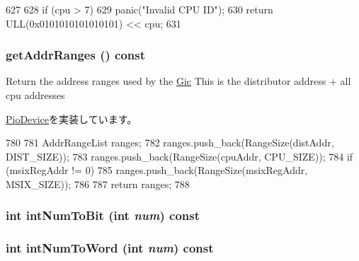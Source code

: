 \begin{DoxyCode}
627 {
628     if (cpu > 7)
629         panic("Invalid CPU ID\n");
630     return ULL(0x0101010101010101) << cpu;
631 }
\end{DoxyCode}
\hypertarget{classPl390_a36cf113d5e5e091ebddb32306c098fae}{
\subsubsection[{getAddrRanges}]{ getAddrRanges () const}}
\label{classPl390_a36cf113d5e5e091ebddb32306c098fae}
Return the address ranges used by the \hyperlink{namespaceGic}{Gic} This is the distributor address + all cpu addresses 

\hyperlink{classPioDevice_a6e967f8921e80748eb2be35b6b481a7e}{PioDevice}を実装しています。


\begin{DoxyCode}
780 {
781     AddrRangeList ranges;
782     ranges.push_back(RangeSize(distAddr, DIST_SIZE));
783     ranges.push_back(RangeSize(cpuAddr, CPU_SIZE));
784     if (msixRegAddr != 0) {
785         ranges.push_back(RangeSize(msixRegAddr, MSIX_SIZE));
786     }
787     return ranges;
788 }
\end{DoxyCode}
\hypertarget{classPl390_a3ea7cede01d4b5413a1f54d9375d9c82}{
\subsubsection[{intNumToBit}]{\setlength{\rightskip}{0pt plus 5cm}int intNumToBit (int {\em num}) const}}
\label{classPl390_a3ea7cede01d4b5413a1f54d9375d9c82}



\hypertarget{classPl390_a297a4fe16fb79c127baa3558efb81261}{
\subsubsection[{intNumToWord}]{\setlength{\rightskip}{0pt plus 5cm}int intNumToWord (int {\em num}) const}}
\label{classPl390_a297a4fe16fb79c127baa3558efb81261}



